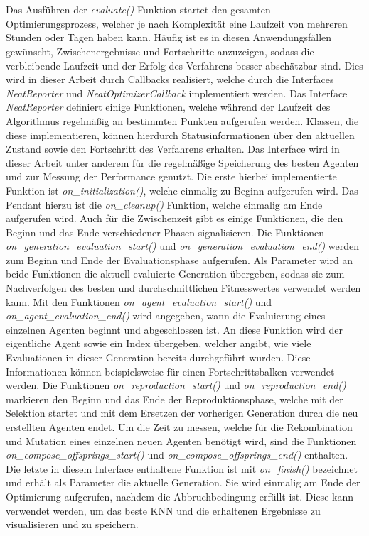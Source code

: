 \\\\
Das Ausführen der \emph{evaluate()} Funktion startet den gesamten Optimierungsprozess, welcher je nach Komplexität eine Laufzeit von mehreren Stunden oder Tagen haben kann. Häufig ist es in diesen Anwendungsfällen gewünscht, Zwischenergebnisse und Fortschritte anzuzeigen, sodass die verbleibende Laufzeit und der Erfolg des Verfahrens besser abschätzbar sind. Dies wird in dieser Arbeit durch Callbacks realisiert, welche durch die Interfaces \emph{NeatReporter} und \emph{NeatOptimizerCallback} implementiert werden. Das Interface \emph{NeatReporter} definiert einige Funktionen, welche während der Laufzeit des Algorithmus regelmäßig an bestimmten Punkten aufgerufen werden. Klassen, die diese implementieren, können hierdurch Statusinformationen über den aktuellen Zustand sowie den Fortschritt des Verfahrens erhalten. Das Interface wird in dieser Arbeit unter anderem für die regelmäßige Speicherung des besten Agenten und zur Messung der Performance genutzt. Die erste hierbei implementierte Funktion ist \emph{on\_initialization()}, welche einmalig zu Beginn aufgerufen wird. Das Pendant hierzu ist die \emph{on\_cleanup()} Funktion, welche einmalig am Ende aufgerufen wird. Auch für die Zwischenzeit gibt es einige Funktionen, die den Beginn und das Ende verschiedener Phasen signalisieren. Die Funktionen \emph{on\_generation\_evaluation\_start()} und \emph{on\_generation\_evaluation\_end()} werden zum Beginn und Ende der Evaluationsphase aufgerufen. Als Parameter wird an beide Funktionen die aktuell evaluierte Generation übergeben, sodass sie zum Nachverfolgen des besten und durchschnittlichen Fitnesswertes verwendet werden kann. Mit den Funktionen \emph{on\_agent\_evaluation\_start()} und \emph{on\_agent\_evaluation\_end()} wird angegeben, wann die Evaluierung eines einzelnen Agenten beginnt und abgeschlossen ist. An diese Funktion wird der eigentliche Agent sowie ein Index übergeben, welcher angibt, wie viele Evaluationen in dieser Generation bereits durchgeführt wurden. Diese Informationen können beispielsweise für einen Fortschrittsbalken verwendet werden. Die Funktionen \emph{on\_reproduction\_start()} und \emph{on\_reproduction\_end()} markieren den Beginn und das Ende der Reproduktionsphase, welche mit der Selektion startet und mit dem Ersetzen der vorherigen Generation durch die neu erstellten Agenten endet. Um die Zeit zu messen, welche für die Rekombination und Mutation eines einzelnen neuen Agenten benötigt wird, sind die Funktionen \emph{on\_compose\_offsprings\_start()} und  \emph{on\_compose\_offsprings\_end()} enthalten. Die letzte in diesem Interface enthaltene Funktion ist mit \emph{on\_finish()} bezeichnet und erhält als Parameter die aktuelle Generation. Sie wird einmalig am Ende der Optimierung aufgerufen, nachdem die Abbruchbedingung erfüllt ist. Diese kann verwendet werden, um das beste \ac{KNN} und die erhaltenen Ergebnisse zu visualisieren und zu speichern.
